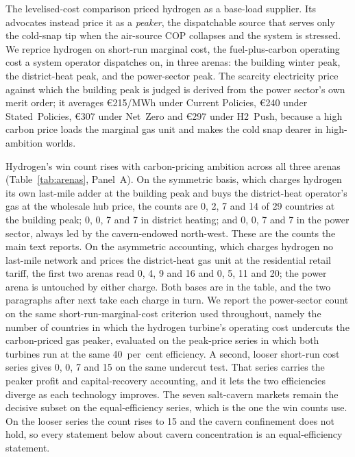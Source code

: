 The levelised-cost comparison priced hydrogen as a base-load supplier. Its advocates instead price it as a
\emph{peaker}, the dispatchable source that serves only the cold-snap tip when
the air-source COP collapses and the system is stressed. We
reprice hydrogen on short-run marginal cost, the fuel-plus-carbon operating cost a
system operator dispatches on, in three arenas: the building winter peak, the
district-heat peak, and the power-sector peak. The scarcity electricity
price against which the building peak is judged is derived
from the power sector's own merit order; it averages \euro{}215/MWh under Current
Policies, \euro{}240 under Stated~Policies, \euro{}307 under Net~Zero and
\euro{}297 under H2~Push, because a
high carbon price loads the marginal gas unit and makes the cold snap dearer in high-ambition worlds.

Hydrogen's win count rises with carbon-pricing ambition across all
three arenas (Table~\ref{tab:arenas}, Panel~A). On the symmetric basis, which charges
hydrogen its own last-mile adder at the building peak and buys the district-heat
operator's gas at the wholesale hub price, the counts are 0, 2, 7 and 14 of 29 countries
at the building peak; 0, 0, 7 and 7 in district heating; and 0, 0, 7 and 7 in the power
sector, always led by the cavern-endowed north-west. These are the counts the main text
reports. On the asymmetric accounting, which charges hydrogen no last-mile
network and prices the district-heat gas unit at the residential retail tariff, the first
two arenas read 0, 4, 9 and 16 and 0, 5, 11 and 20; the power arena is untouched by
either charge. Both bases are in the table, and the two paragraphs after next take each
charge in turn. We report the
power-sector count on the same short-run-marginal-cost criterion used throughout,
namely the number of countries in which the hydrogen turbine's operating cost
undercuts the carbon-priced gas peaker, evaluated on the peak-price series in which
both turbines run at the same 40~per~cent efficiency. A second, looser short-run cost series gives 0, 0, 7 and 15 on the same undercut test.
That series carries the peaker profit and capital-recovery accounting, and it lets the
two efficiencies diverge as each technology improves. The seven salt-cavern markets
remain the decisive subset on the equal-efficiency series, which is the one the win counts
use. On the looser series the count rises to 15 and the cavern confinement does not hold,
so every statement below about cavern concentration is an equal-efficiency statement.

